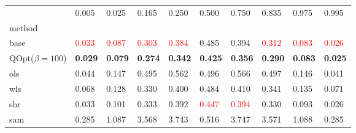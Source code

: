 \begin{tabular}{llllllllll}
\toprule
 & 0.005 & 0.025 & 0.165 & 0.250 & 0.500 & 0.750 & 0.835 & 0.975 & 0.995 \\
method &  &  &  &  &  &  &  &  &  \\
\midrule
base & \textcolor{red}{0.033} & \textcolor{red}{0.087} & \textcolor{red}{0.303} & \textcolor{red}{0.384} & 0.485 & 0.394 & \textcolor{red}{0.312} & \textcolor{red}{0.083} & \textcolor{red}{0.026} \\
\midrule
QOpt($\beta=100$) & \textbf{0.029} & \textbf{0.079} & \textbf{0.274} & \textbf{0.342} & \textbf{0.425} & \textbf{0.356} & \textbf{0.290} & \textbf{0.083} & \textbf{0.025} \\
ols & 0.044 & 0.147 & 0.495 & 0.562 & 0.496 & 0.566 & 0.497 & 0.146 & 0.041 \\
wls & 0.068 & 0.128 & 0.330 & 0.400 & 0.484 & 0.410 & 0.341 & 0.135 & 0.071 \\
shr & 0.033 & 0.101 & 0.333 & 0.392 & \textcolor{red}{0.447} & \textcolor{red}{0.394} & 0.330 & 0.093 & 0.026 \\
sam & 0.285 & 1.087 & 3.568 & 3.743 & 0.516 & 3.747 & 3.571 & 1.088 & 0.285 \\
\bottomrule
\end{tabular}